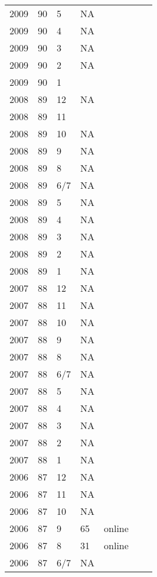 \begin{longtable}{ |l|l|l|l|p{2.7cm}|l|p{2cm}| }
 2009 & 90 &     5 &      NA &  &  & \\
 2009 & 90 &     4 &      NA &  &  & \\
 2009 & 90 &     3 &      NA &  &  & \\
 2009 & 90 &     2 &      NA &  &  & \\
 2009 & 90 &     1 &         &  &  & \\
 2008 & 89 &    12 &      NA &  &  & \\
 2008 & 89 &    11 &         &  &  & \\
 2008 & 89 &    10 &      NA &  &  & \\
 2008 & 89 &     9 &      NA &  &  & \\
 2008 & 89 &     8 &      NA &  &  & \\
 2008 & 89 &   6/7 &      NA &  &  & \\
 2008 & 89 &     5 &      NA &  &  & \\
 2008 & 89 &     4 &      NA &  &  & \\
 2008 & 89 &     3 &      NA &  &  & \\
 2008 & 89 &     2 &      NA &  &  & \\
 2008 & 89 &     1 &      NA &  &  & \\
 2007 & 88 &    12 &      NA &  &  & \\
 2007 & 88 &    11 &      NA &  &  & \\
 2007 & 88 &    10 &      NA &  &  & \\
 2007 & 88 &     9 &      NA &  &  & \\
 2007 & 88 &     8 &      NA &  &  & \\
 2007 & 88 &   6/7 &      NA &  &  & \\
 2007 & 88 &     5 &      NA &  &  & \\
 2007 & 88 &     4 &      NA &  &  & \\
 2007 & 88 &     3 &      NA &  &  & \\
 2007 & 88 &     2 &      NA &  &  & \\
 2007 & 88 &     1 &      NA &  &  & \\
 2006 & 87 &    12 &      NA &  &  & \\
 2006 & 87 &    11 &      NA &  &  & \\
 2006 & 87 &    10 &      NA &  &  & \\
 2006 & 87 &     9 &      65 & online &  & \\
 2006 & 87 &     8 &      31 & online &  & \\
 2006 & 87 &   6/7 &      NA &  &  & \\

\end{longtable}
